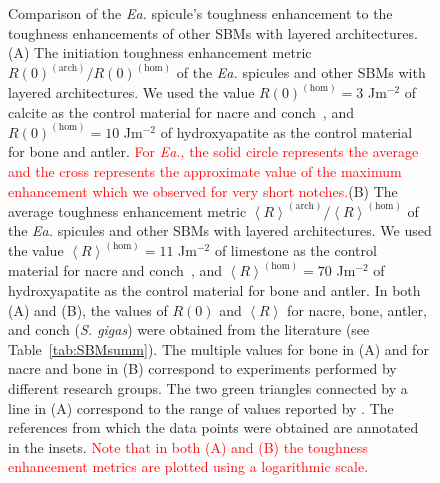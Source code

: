 \documentclass[12pt,onecolumn]{article}
\makeatletter
\newcommand{\EA}{\textit{Ea.\@}\xspace}
\makeatother
\begin{document}
\begin{bibunit}
\begin{figure}[ht!]
{			Comparison of the \EA spicule's toughness enhancement to the toughness enhancements of other SBMs with layered architectures. (A)  The initiation toughness enhancement metric $R(0)^{(\mathrm{arch})}/R(0)^{(\mathrm{hom})}$ of the \EA spicules and other SBMs with layered architectures. We used the value $R(0)^{(\mathrm{hom})}=3$ Jm$^{-2}$ of calcite as the control material for nacre and conch~\cite{wegst2004mechanical}, and $R(0)^{(\mathrm{hom})}=10$ Jm$^{-2}$ of hydroxyapatite \cite{wegst2004mechanical} as the control material for bone and antler. \textcolor{red}{For \EA, the solid circle represents the average and the cross represents the approximate value of the maximum enhancement which we observed for very short notches.}(B) The average toughness enhancement metric $\left< R\right>^{(\mathrm{arch})}/\left< R\right>^{(\mathrm{hom})}$ of the \EA spicules and other SBMs with layered architectures. We used the value $\left< R\right>^{(\mathrm{hom})}=11$ Jm$^{-2}$ of limestone as the control material for nacre and conch~\cite{carmichael1982crc}, and $\left< R\right>^{(\mathrm{hom})}=70$ Jm$^{-2}$ of hydroxyapatite \cite{tenhuisen1995formation} as the control material for bone and antler. In both (A) and (B), the values of $R(0)$ and $\left< R \right>$ for nacre, bone, antler, and conch (\textit{S. gigas}) were obtained from the literature (see Table~\ref{tab:SBMsumm}). The multiple values for bone in (A) and for nacre and bone in (B) correspond to experiments performed by different research groups. The two green triangles connected by a line in (A) correspond to the range of values reported by \cite{koester2008true}. The references from which the data points were obtained are annotated in the insets. \textcolor{red}{Note that in both (A) and (B) the toughness enhancement metrics are plotted using a logarithmic scale.}
			}
			\label{fig:SBMcomp}
			\end{figure}
			

\end{bibunit}
\end{document}
